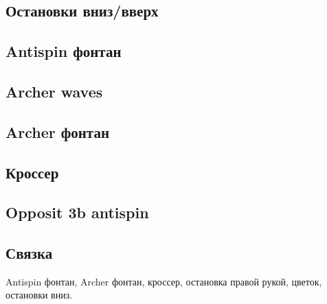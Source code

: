 \documentclass[a4paper, 12pt]{article}
\begin{document}
	\subsection{Остановки вниз/вверх}
	\subsection{Antispin фонтан}
	\subsection{Archer waves}
	\subsection{Archer фонтан}
	\subsection{Кроссер}
	\subsection{Opposit 3b antispin}
	\subsection{Связка}
	Antispin фонтан, Archer фонтан, кроссер, остановка правой рукой, цветок, остановки вниз.
	  
	
	
	
	
	
\end{document}

